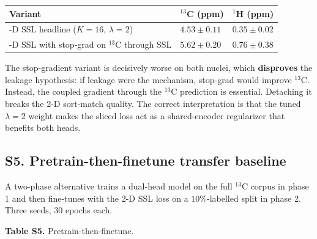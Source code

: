 \documentclass[
  11pt,
  a4paper,
]{article}
\newcounter{none} %
\begin{document}
{\def\LTcaptype{none} %
\begin{longtable}[]{@{}
  >{\raggedright\arraybackslash}p{}
  >{\raggedright\arraybackslash}p{}
  >{\raggedright\arraybackslash}p{}@{}}
\toprule\noalign{}
\begin{minipage}[b]{\linewidth}\raggedright
Variant
\end{minipage} & \begin{minipage}[b]{\linewidth}\raggedright
\(^{13}\)C (ppm)
\end{minipage} & \begin{minipage}[b]{\linewidth}\raggedright
\(^{1}\)H (ppm)
\end{minipage} \\
\midrule\noalign{}
\endhead
\bottomrule\noalign{}
\endlastfoot
2-D SSL headline (\(K=16\), \(\lambda=2\)) & \(4.53 \pm 0.11\) & \(0.35 \pm 0.02\) \\
2-D SSL with stop-grad on \(^{13}\)C through SSL & \(5.62 \pm 0.20\) & \(0.76 \pm 0.38\) \\
\end{longtable}
}

The stop-gradient variant is decisively worse on both nuclei, which
\textbf{disproves} the leakage hypothesis: if leakage were the mechanism,
stop-grad would improve \(^{13}\)C. Instead, the coupled gradient
through the \(^{13}\)C prediction is essential. Detaching it breaks the
2-D sort-match quality. The correct interpretation is that the tuned
\(\lambda = 2\) weight makes the sliced loss act as a shared-encoder
regularizer that benefits both heads.

\subsection*{S5. Pretrain-then-finetune transfer baseline}

A two-phase alternative trains a dual-head model on the full
\(^{13}\)C corpus in phase 1 and then fine-tunes with the 2-D SSL loss on
a \(10\%\)-labelled split in phase 2. Three seeds, 30 epochs each.

\textbf{Table S5.} Pretrain-then-finetune.
\end{document}
